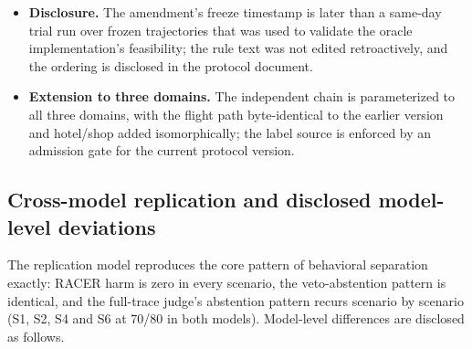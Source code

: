 \documentclass[10pt]{article}
\begin{document}
\begin{itemize}
  \item \textbf{Disclosure.} The amendment's freeze timestamp is later than a same-day trial run over frozen trajectories that was used to validate the oracle implementation's feasibility; the rule text was not edited retroactively, and the ordering is disclosed in the protocol document.

  \item \textbf{Extension to three domains.} The independent chain is parameterized to all three domains, with the flight path byte-identical to the earlier version and hotel/shop added isomorphically; the label source is enforced by an admission gate for the current protocol version.

\end{itemize}

\subsection{Cross-model replication and disclosed model-level deviations}

The replication model reproduces the core pattern of behavioral separation exactly: RACER harm is zero in every scenario, the veto-abstention pattern is identical, and the full-trace judge's abstention pattern recurs scenario by scenario (S1, S2, S4 and S6 at 70/80 in both models). Model-level differences are disclosed as follows.
\end{document}
